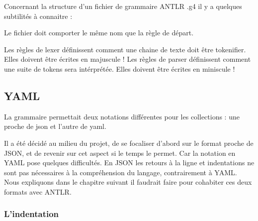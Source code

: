 \documentclass[
    iict, %
    il, %
]{heig-tb}
\begin{document}
Concernant la structure d'un fichier de grammaire ANTLR .g4 il y a quelques subtilités à connaitre :

Le fichier doit comporter le même nom que la règle de départ. %

Les règles de lexer définissent comment une chaine de texte doit être tokenifier. Elles doivent être écrites en majuscule !
Les règles de parser définissent comment une suite de tokens sera intérprétée. Elles doivent être écrites en miniscule !







\subsection{YAML}
La grammaire permettait deux notations différentes pour les collections : une proche de json et l'autre de yaml.


Il a été décidé au milieu du projet, de se focaliser d'abord sur le format proche de JSON, et de revenir sur cet aspect si le temps le permet.
Car la notation en YAML pose quelques difficultés. %
En JSON les retours à la ligne et indentations ne sont pas nécessaires à la compréhension du langage, contrairement à YAML.
Nous expliquons dans le chapitre suivant il faudrait faire pour cohabiter ces deux formats avec ANTLR. %

\subsubsection{L'indentation}
\end{document}
